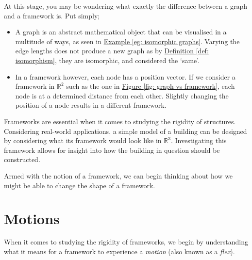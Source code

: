 \begin{flushleft}
At this stage, you may be wondering what exactly the difference between a graph and a framework is. Put simply;
\begin{itemize}
    \item A graph is an abstract mathematical object that can be visualised in a multitude of ways, as seen in \hyperref[eg: isomorphic graphs]{Example \ref*{eg: isomorphic graphs}}. Varying the edge lengths does not produce a new graph as by \hyperref[def: isomorphism]{Definition \ref*{def: isomorphism}}, they are isomorphic, and considered the `same'.
    \vspace{-3mm}
    \item In a framework however, each node has a position vector. If we consider a framework in $\mathbb{R}^2$ such as the one in \hyperref[g vs f]{Figure \ref{fig: graph vs framework}}, each node is at a determined distance from each other. Slightly changing the position of a node results in a different framework.

\end{itemize}
\end{flushleft}

\begin{flushleft}
Frameworks are essential when it comes to studying the rigidity of structures. Considering real-world applications, a simple model of a building can be designed by considering what its framework would look like in $\mathbb{R}^3$. Investigating this framework allows for insight into how the building in question should be constructed.
\end{flushleft}

\noindent
Armed with the notion of a framework, we can begin thinking about how we might be able to change the shape of a framework. 

\section{Motions}

\begin{flushleft}
When it comes to studying the rigidity of frameworks, we begin by understanding what it means for a framework to experience a \textit{motion} (also known as a \textit{flex}). 
\end{flushleft}

